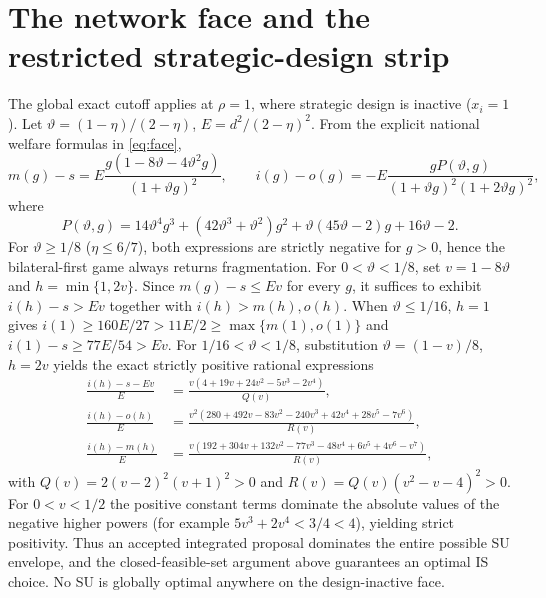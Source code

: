 \section{The network face and the restricted strategic-design strip}\label{app:networkfull}
The global exact cutoff applies at $\rho=1$, where strategic design is inactive ($x_i=1$). Let $\vartheta=(1-\eta)/(2-\eta)$, $E=d^2/(2-\eta)^2$. From the explicit national welfare formulas in \eqref{eq:face},
\begin{equation}\label{eq:networkpoly}
m(g)-s=E\frac{g(1-8\vartheta-4\vartheta^2g)}{(1+\vartheta g)^2},\qquad
 i(g)-o(g)=-E\frac{gP(\vartheta,g)}{(1+\vartheta g)^2(1+2\vartheta g)^2},
\end{equation}
where
\[
P(\vartheta,g)=14\vartheta^4g^3+(42\vartheta^3+\vartheta^2)g^2+\vartheta(45\vartheta-2)g+16\vartheta-2.
\]
For $\vartheta\ge1/8$ ($\eta\le6/7$), both expressions are strictly negative for $g>0$, hence the bilateral-first game always returns fragmentation. For $0<\vartheta<1/8$, set $v=1-8\vartheta$ and $h=\min\{1,2v\}$. Since $m(g)-s\le E v$ for every $g$, it suffices to exhibit $i(h)-s>Ev$ together with $i(h)>m(h),o(h)$. When $\vartheta\le1/16$, $h=1$ gives $i(1)\ge160E/27>11E/2\ge\max\{m(1),o(1)\}$ and $i(1)-s\ge77E/54>Ev$. For $1/16<\vartheta<1/8$, substitution $\vartheta=(1-v)/8$, $h=2v$ yields the exact strictly positive rational expressions
\begin{align*}
\frac{i(h)-s-Ev}{E}&=\frac{v(4+19v+24v^2-5v^3-2v^4)}{Q(v)},\\
\frac{i(h)-o(h)}{E}&=\frac{v^2(280+492v-83v^2-240v^3+42v^4+28v^5-7v^6)}{R(v)},\\
\frac{i(h)-m(h)}{E}&=\frac{v(192+304v+132v^2-77v^3-48v^4+6v^5+4v^6-v^7)}{R(v)},
\end{align*}
with $Q(v)=2(v-2)^2(v+1)^2>0$ and $R(v)=Q(v)(v^2-v-4)^2>0$. For $0<v<1/2$ the positive constant terms dominate the absolute values of the negative higher powers (for example $5v^3+2v^4<3/4<4$), yielding strict positivity. Thus an accepted integrated proposal dominates the entire possible SU envelope, and the closed-feasible-set argument above guarantees an optimal IS choice. No SU is globally optimal anywhere on the design-inactive face.

